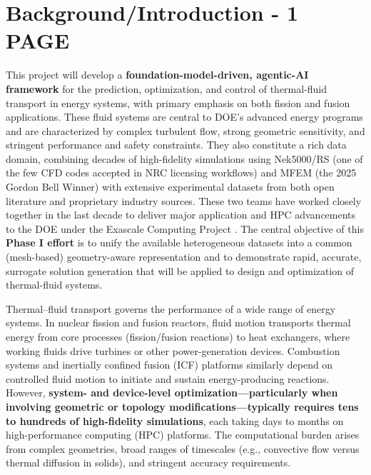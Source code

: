 \section{Background/Introduction  -   1 PAGE}

This project will develop a {\bf foundation-model-driven, agentic-AI framework}
\cite{Vinuesa2026XAI} for the prediction, optimization, and control of
thermal-fluid transport in energy systems, with primary emphasis on
both fission and fusion applications.
  These fluid systems are central to DOE’s advanced energy programs and
are characterized by complex turbulent flow, strong geometric sensitivity,
and stringent performance and safety constraints.
  They also constitute a rich data domain, combining decades of high-fidelity
simulations using Nek5000/RS (one of the few CFD codes accepted in NRC
licensing workflows) and MFEM (the 2025 Gordon Bell Winner) with extensive
experimental datasets from both open literature and proprietary industry sources.
  These two teams have worked closely together in the last decade to deliver major
application and HPC advancements to the DOE under the Exascale Computing Project \cite{ceed}.
   The central objective of this {\bf Phase I effort} is to unify the available heterogeneous
datasets into a common (mesh-based) geometry-aware representation and to demonstrate rapid,
accurate, surrogate solution generation that will be applied to design and
optimization of thermal-fluid systems.

Thermal–fluid transport governs the performance of a wide range of energy systems.
In nuclear fission and fusion reactors, fluid motion transports thermal energy
from core processes (fission/fusion reactions) to heat exchangers, where working
fluids drive turbines or other power-generation devices. Combustion systems and
inertially confined fusion (ICF) platforms similarly depend on controlled fluid
motion to initiate and sustain energy-producing reactions.
However, {\bf system- and device-level optimization—particularly when involving
geometric or topology modifications—typically requires tens to hundreds of high-fidelity
simulations}, each taking days to months on high-performance computing (HPC) platforms.
The computational burden arises from complex geometries, broad ranges of timescales
(e.g., convective flow versus thermal diffusion in solids), and stringent
accuracy requirements.

